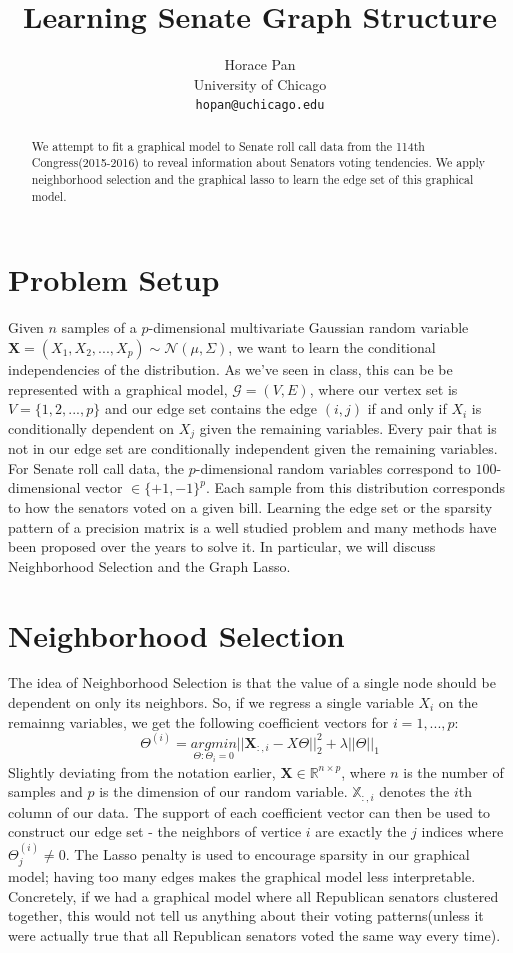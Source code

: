 \documentclass{article}
\title{Learning Senate Graph Structure}
\author{
  Horace Pan\\
  University of Chicago\\
  \texttt{hopan@uchicago.edu} \\
}
\begin{document}

\maketitle

\begin{abstract}
We attempt to fit a graphical model to Senate roll call data from the 114th Congress(2015-2016) to
reveal information about Senators voting tendencies. We apply neighborhood selection and the graphical
lasso to learn the edge set of this graphical model.
\end{abstract}

\section{Problem Setup}
Given $n$ samples of a $p$-dimensional multivariate Gaussian random variable $\mathbf{X} = (X_1, X_2, ..., X_p) \sim \mathcal{N}(\mu, \Sigma)$,
we want to learn the conditional independencies of the distribution. As we've seen in class, this can be
be represented with a graphical model, $\mathcal{G} = (V, E)$, where our vertex set is $V= \{1, 2, ..., p\}$ and our edge set
contains the edge $(i, j)$ if and only if $X_i$ is conditionally dependent on $X_j$ given the remaining variables. Every pair that is
not in our edge set are conditionally independent given the remaining variables. For Senate roll call data, the $p$-dimensional random variables correspond to 
$100$-dimensional vector $\in \{+1, -1\}^p$. Each sample from this distribution corresponds to how the senators voted on a given bill. Learning the edge set or the sparsity pattern of a precision matrix is a well studied problem and many methods have been proposed over the years to solve it. In particular, we will discuss Neighborhood Selection and the Graph Lasso.

\section{Neighborhood Selection}
The idea of Neighborhood Selection is that the value of a single node 
should be dependent on only its neighbors. So, if we regress a single variable $X_i$ on the remainng
variables, we get the following coefficient vectors for $i=1, ..., p$: 
$$\Theta^{(i)} = \underset{\Theta: \Theta_i = 0}{argmin} || \mathbf{X}_{:,i} - X \Theta||_2^2 + \lambda ||\Theta||_1$$
Slightly deviating from the notation earlier, $\mathbf{X} \in \mathbb{R}^{n \times p}$, where $n$ is the number of samples and $p$ is the dimension of our random variable. $\mathbb{X}_{:, i}$ denotes the $i$th column of our data. The support of each coefficient vector can then be used to construct our edge set - the neighbors of vertice $i$ are exactly the $j$ indices where $\Theta_j^{(i)} \not = 0$. 
The Lasso penalty is used to encourage sparsity in our graphical model; having too many edges makes the graphical model less interpretable. 
Concretely, if we had a graphical model where all Republican senators clustered together, this would not tell us anything about their voting patterns(unless it were actually true that all Republican senators voted the same way every time).
\end{document}
